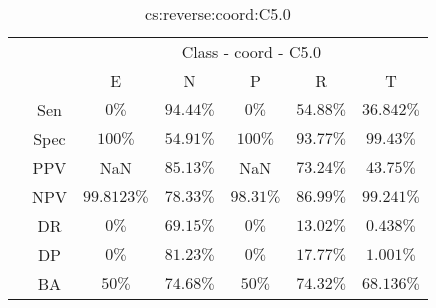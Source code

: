 \begin{table}[!ht]
	\centering
	\begin{tabular}{|c|c|c|c|c|c|c|}
		\cline{3-7}
		\multicolumn{2}{c|}{} & \multicolumn{5}{c|}{Class - coord - C5.0} \\ \cline{3-7}
		\multicolumn{2}{c|}{} & E & N & P & R & T \\ \hline
		\multirow{7}{*}{\rotatebox{90}{Statistics}} & Sen & $0\%$ & $94.44\%$ & $0\%$ & $54.88\%$ & $36.842\%$ \\ \cline{2-7}
		 & Spec & $100\%$ & $54.91\%$ & $100\%$ & $93.77\%$ & $99.43\%$ \\ \cline{2-7}
		 & PPV & NaN & $85.13\%$ & NaN & $73.24\%$ & $43.75\%$ \\ \cline{2-7}
		 & NPV & $99.8123\%$ & $78.33\%$ & $98.31\%$ & $86.99\%$ & $99.241\%$ \\ \cline{2-7}
		 & DR & $0\%$ & $69.15\%$ & $0\%$ & $13.02\%$ & $0.438\%$ \\ \cline{2-7}
		 & DP & $0\%$ & $81.23\%$ & $0\%$ & $17.77\%$ & $1.001\%$ \\ \cline{2-7}
		 & BA & $50\%$ & $74.68\%$ & $50\%$ & $74.32\%$ & $68.136\%$ \\ \hline
	\end{tabular}
	\caption{cs:reverse:coord:C5.0}
	\label{tab:cs:reverse:coord:C5.0}
\end{table}
